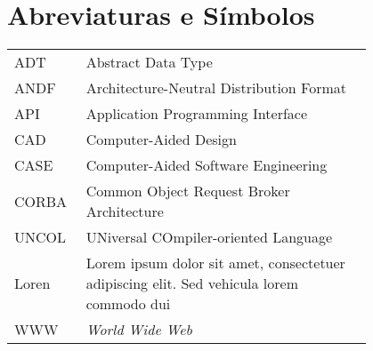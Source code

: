 \chapter*{Abreviaturas e Símbolos}

\begin{flushleft}
\begin{tabular}{l p{0.8\linewidth}}
ADT      & Abstract Data Type\\
ANDF     & Architecture-Neutral Distribution Format\\
API      & Application Programming Interface\\
CAD      & Computer-Aided Design\\
CASE     & Computer-Aided Software Engineering\\
CORBA    & Common Object Request Broker Architecture\\
UNCOL    & UNiversal COmpiler-oriented Language\\
Loren    & Lorem ipsum dolor sit amet, consectetuer adipiscing
elit. Sed vehicula lorem commodo dui\\
WWW      & \emph{World Wide Web}
\end{tabular}
\end{flushleft}

